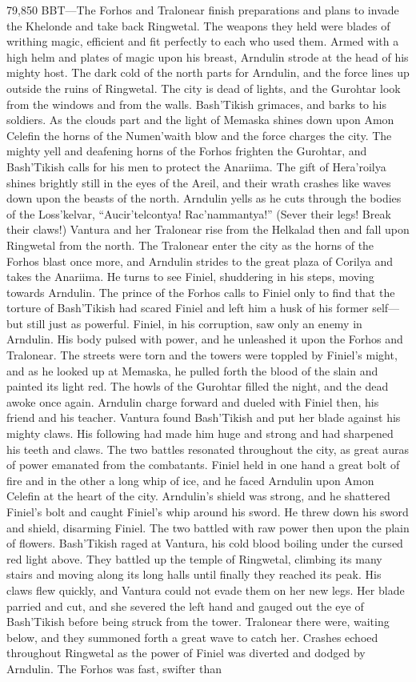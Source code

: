 \documentclass[smalldemyvopaper,11pt,twoside,onecolumn,openright,extrafontsizes]{memoir}
\begin{document}
{{79,850 BBT—The Forhos and Tralonear finish preparations and plans to invade the Khelonde and take back Ringwetal. The weapons they held were blades of writhing magic, efficient and fit perfectly to each who used them. Armed with a high helm and plates of magic upon his breast, Arndulin strode at the head of his mighty host. The dark cold of the north parts for Arndulin, and the force lines up outside the ruins of Ringwetal. The city is dead of lights, and the Gurohtar look from the windows and from the walls. Bash’Tikish grimaces, and barks to his soldiers. As the clouds part and the light of Memaska shines down upon Amon Celefin the horns of the Numen’waith blow and the force charges the city. The mighty yell and deafening horns of the Forhos frighten the Gurohtar, and Bash’Tikish calls for his men to protect the Anariima. The gift of Hera’roilya shines brightly still in the eyes of the Areil, and their wrath crashes like waves down upon the beasts of the north.  Arndulin yells as he cuts through the bodies of the Loss’kelvar, “Aucir’telcontya! Rac’nammantya!” (Sever their legs! Break their claws!) Vantura and her Tralonear rise from the Helkalad then and fall upon Ringwetal from the north. The Tralonear enter the city as the horns of the Forhos blast once more, and Arndulin strides to the great plaza of Corilya and takes the Anariima. He turns to see Finiel, shuddering in his steps, moving towards Arndulin. The prince of the Forhos calls to Finiel only to find that the torture of Bash’Tikish had scared Finiel and left him a husk of his former self—but still just as powerful. Finiel, in his corruption, saw only an enemy in Arndulin. His body pulsed with power, and he unleashed it upon the Forhos and Tralonear. The streets were torn and the towers were toppled by Finiel’s might, and as he looked up at Memaska, he pulled forth the blood of the slain and painted its light red. The howls of the Gurohtar filled the night, and the dead awoke once again. Arndulin charge forward and dueled with Finiel then, his friend and his teacher. Vantura found Bash’Tikish and put her blade against his mighty claws. His following had made him huge and strong and had sharpened his teeth and claws. The two battles resonated throughout the city, as great auras of power emanated from the combatants. Finiel held in one hand a great bolt of fire and in the other a long whip of ice, and he faced Arndulin upon Amon Celefin at the heart of the city. Arndulin’s shield was strong, and he shattered Finiel’s bolt and caught Finiel’s whip around his sword. He threw down his sword and shield, disarming Finiel. The two battled with raw power then upon the plain of flowers. Bash’Tikish raged at Vantura, his cold blood boiling under the cursed red light above. They battled up the temple of Ringwetal, climbing its many stairs and moving along its long halls until finally they reached its peak. His claws flew quickly, and Vantura could not evade them on her new legs. Her blade parried and cut, and she severed the left hand and gauged out the eye of Bash’Tikish before being struck from the tower. Tralonear there were, waiting below, and they summoned forth a great wave to catch her. Crashes echoed throughout Ringwetal as the power of Finiel was diverted and dodged by Arndulin. The Forhos was fast, swifter than }}
\end{document}
